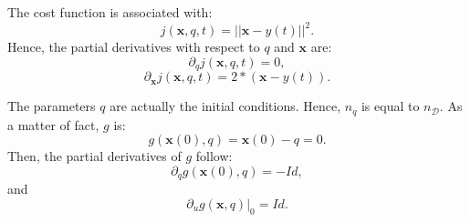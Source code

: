 \documentclass[aip,pof,nofootinbib,reprint,onecolumn]{revtex4-1}
\newcommand{\gras}[1]{\boldsymbol{#1}}
\newcommand{\mypar}[1]{\left(#1\right)}
\newcommand{\Nphaz}{n_{\mathcal{D}}} %
\newcommand{\costff}{j} %
\newcommand{\obs}{y} %
\newcommand{\point}{\gras{x}} %
\begin{document}
The cost function is associated with:
$$\costff\mypar{\point,q,t} = || \point-\obs(t)||^2.$$
Hence, the partial derivatives with respect to $q$ and $\point$ are:
$$\partial_q \costff\mypar{\point,q,t} = 0,$$
$$\partial_{\point} \costff\mypar{\point,q,t} = 2*\mypar{\point-\obs(t)}.$$

The parameters $q$ are actually the initial conditions. Hence, $n_q$ is equal to $\Nphaz$. As a matter of fact, $g$ is:
$$g(\point(0),q) = \point(0)-q = 0.$$
Then, the partial derivatives of $g$ follow:
$$\partial_q g(\point(0),q) = -Id,$$
and
$$\partial_u g(\point,q)|_0 = Id.$$
\end{document}
